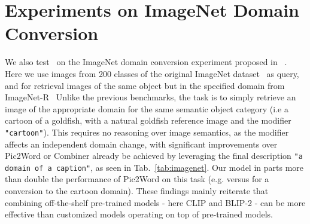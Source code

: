 \documentclass{article} \usepackage{iclr2024_conference,times}
\begin{document}
\section{Experiments on ImageNet Domain Conversion}
\begin{table}[t]
\centering
\caption{\textbf{Evaluation on ImageNet Domain Conversion experiment proposed in \cite{pic2word}.} The goal is to retrieve an appropriate domain of the object specified in the query image.} 
\vspace{-6pt}
\label{tab:imagenet}
\vspace{-8pt}
\end{table}
 We also test \methodNameNS\ on the ImageNet domain conversion experiment proposed in ~\citep{pic2word}. Here we use images from 200 classes of the original ImageNet dataset~\citep{imagenet} as query, and for retrieval images of the same object but in the specified domain from ImageNet-R~\citep{imagenetr}
Unlike the previous benchmarks, the task is to simply retrieve an image of the appropriate domain for the same semantic object category (i.e a cartoon of a goldfish, with a natural goldfish reference image and the modifier \texttt{"cartoon"}).  
This requires no reasoning over image semantics, as the modifier affects an independent domain change, with significant improvements over Pic2Word or Combiner already be achieved by leveraging the final description \texttt{"a {domain} of a {caption}"}, as seen in Tab.~\ref{tab:imagenet}. Our model in parts more than double the performance of Pic2Word on this task (e.g.  versus  for a conversion to the cartoon domain). 
These findings mainly reiterate that combining off-the-shelf pre-trained models - here CLIP and BLIP-2 - can be more effective than customized models operating on top of pre-trained models.
\end{document}

